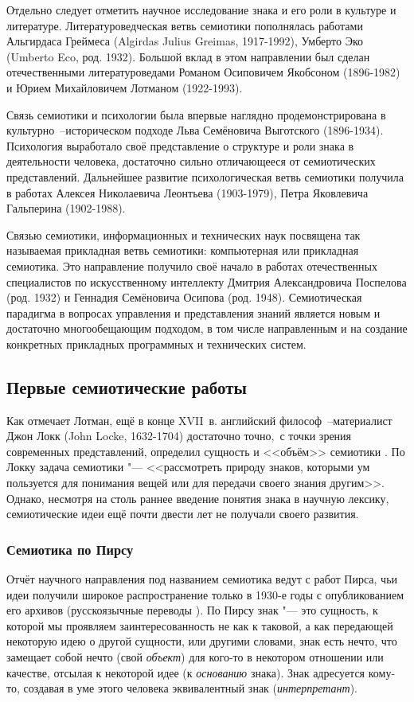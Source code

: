 \documentclass[a4paper,12pt]{article}
\begin{document}
	Отдельно следует отметить научное исследование знака и его роли в культуре и литературе. Литературоведческая ветвь семиотики пополнялась работами Альгирдаса Греймеса (Algirdas Julius Greimas, 1917-1992), Умберто Эко (Umberto Eco, род. 1932). Большой вклад в этом направлении был сделан отечественными литературоведами Романом Осиповичем Якобсоном (1896-1982) и Юрием Михайловичем Лотманом (1922-1993).
	
	Связь семиотики и психологии была впервые наглядно продемонстрирована в культурно~--историческом подходе Льва Семёновича Выготского (1896-1934). Психология выработало своё представление о структуре и роли знака в деятельности человека, достаточно сильно отличающееся от семиотических представлений. Дальнейшее развитие психологическая ветвь семиотики получила в работах Алексея Николаевича Леонтьева (1903-1979), Петра Яковлевича Гальперина (1902-1988).
	
	Связью семиотики, информационных и технических наук посвящена так называемая прикладная ветвь семиотики: компьютерная или прикладная семиотика. Это направление получило своё начало в работах отечественных специалистов по искусственному интеллекту Дмитрия Александровича Поспелова (род. 1932) и Геннадия Семёновича Осипова (род. 1948). Семиотическая парадигма в вопросах управления и представления знаний является новым и достаточно многообещающим подходом, в том числе направленным и на создание конкретных прикладных программных и технических систем.
	
	\subsection{Первые семиотические работы}
	
	Как отмечает Лотман, ещё в конце XVII~в. английский философ~--материалист Джон Локк (John Locke, 1632-1704) достаточно точно,~с точки зрения современных представлений, определил сущность и <<объём>> семиотики \cite[8]{Lotman2000}. По Локку задача семиотики "--- <<рассмотреть природу знаков, которыми ум пользуется для понимания вещей или для передачи своего знания другим>>. Однако, несмотря на столь раннее введение понятия знака в научную лексику, семиотические идеи ещё почти двести лет не получали своего развития.
	
	\subsubsection{Семиотика по Пирсу}
	Отчёт научного направления под названием семиотика ведут с работ Пирса, чьи идеи получили широкое распространение только в 1930-е годы с опубликованием его архивов (русскоязычные переводы \cite{Pierce2000a,Pierce2000b, Pierce2009}). По Пирсу знак "--- это сущность, к которой мы проявляем заинтересованность не как к таковой, а как передающей некоторую идею о другой сущности, или другими словами, знак есть нечто, что замещает собой нечто (свой \textit{объект}) для кого-то в некотором отношении или качестве, отсылая к некоторой идее (к \textit{основанию} знака). Знак адресуется кому-то, создавая в уме этого человека эквивалентный знак (\textit{интерпретант}).
	
\end{document}
